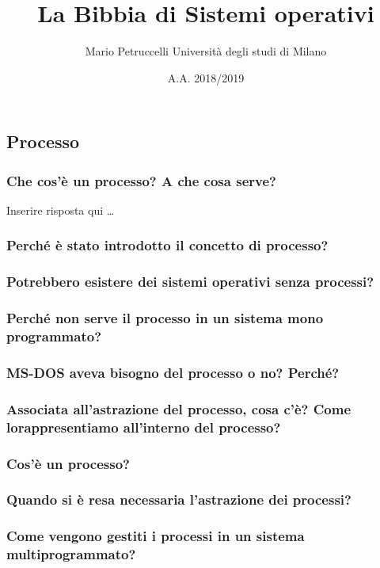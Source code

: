 \documentclass[12pt, letterpaper]{article}
\title{La Bibbia di Sistemi operativi}
\author{Mario Petruccelli \cr Università degli studi di Milano}
\date{A.A. 2018/2019}
\begin{document}
\begin{titlepage}
\maketitle
\newpage
\tableofcontents
\newpage

\section{Processo} 
	\subsubsection{Che cos’è un processo? A che cosa serve?}
		Inserire risposta qui \dots
	\subsubsection{Perché è stato introdotto il concetto di processo?}
	\subsubsection{Potrebbero esistere dei sistemi operativi senza processi?}
	\subsubsection{Perché non serve il processo in un sistema mono programmato?}
	\subsubsection{MS-DOS aveva bisogno del processo o no? Perché?}
	\subsubsection{Associata all’astrazione del processo, cosa c’è? Come lorappresentiamo  all’interno  del  processo?}
	\subsubsection{Cos’è  un  processo?}
	\subsubsection{Quando  si  è  resa  necessaria  l’astrazione  dei  processi?}
	\subsubsection{Come vengono gestiti i processi  in  un  sistema  multiprogrammato?} 


\end{titlepage}
\end{document}

